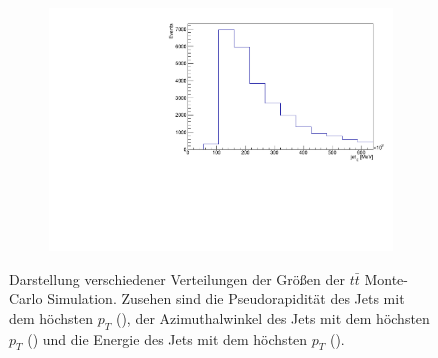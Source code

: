 \begin{figure}[H]
\begin{subfigure}{0.5\textwidth}
    \includegraphics[width=\linewidth]{plots_and_txt/ttbar.mu_selected_/ttbar.mu_selected_jet_E.pdf}
    \caption{}
    \label{fig:jet_pt_good4}
  \end{subfigure}%
  \caption{Darstellung verschiedener Verteilungen der Größen der $t\bar{t}$ Monte-Carlo Simulation.
  Zusehen sind die Pseudorapidität des Jets mit dem höchsten $p_T$ (),  der Azimuthalwinkel des Jets mit dem höchsten $p_T$ () und die Energie des Jets mit dem höchsten $p_T$ ().
  }
  \label{fig:Distributions4}
\end{figure}

